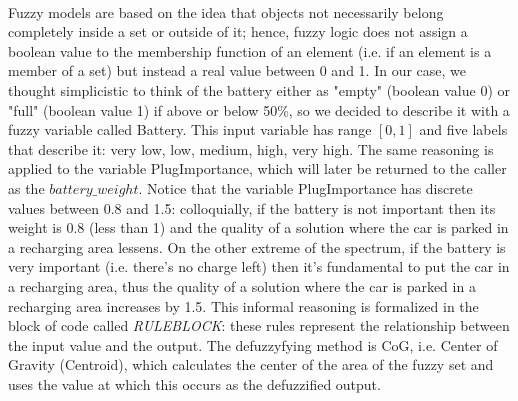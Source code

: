 \paragraph{} Fuzzy models are based on the idea that objects not necessarily belong completely inside a set or outside of it; hence, fuzzy logic does not assign a boolean value to the membership function of an element (i.e. if an element is a member of a set) but instead a real value between 0 and 1. In our case, we thought simplicistic to think of the battery either as "empty" (boolean value 0) or "full" (boolean value 1) if above or below 50\%, so we decided to describe it with a fuzzy variable called Battery. This input variable has range $[0, 1]$ and five labels that describe it: very low, low, medium, high, very high. The same reasoning is applied to the variable PlugImportance, which will later be returned to the caller as the $battery\_weight$. Notice that the variable PlugImportance has discrete values between 0.8 and 1.5: colloquially, if the battery is not important then its weight is 0.8 (less than 1) and the quality of a solution where the car is parked in a recharging area lessens. On the other extreme of the spectrum, if the battery is very important (i.e. there's no charge left) then it's fundamental to put the car in a recharging area, thus the quality of a solution where the car is parked in a recharging area increases by 1.5.
This informal reasoning is formalized in the block of code called \textit{RULEBLOCK}: these rules represent the relationship between the input value and the output. 
The defuzzyfying method is CoG, i.e. Center of Gravity (Centroid), which calculates the center of the area of the fuzzy set and uses the value at which this occurs as the defuzzified output.